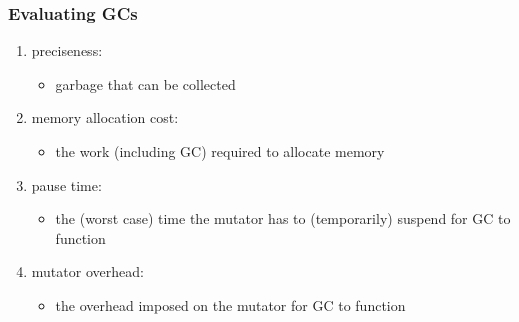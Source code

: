 \documentclass[11pt,dvipdfmx]{beamer}
\newif\ifja
\newif\ifeng
\newcommand{\ao}[1]{{\color{blue}#1}}
\newcommand{\aka}[1]{{\color{red}#1}}
\begin{document}
\begin{frame}
\frametitle{Evaluating GCs}
\begin{enumerate}
\item \ao{preciseness:} 
  \begin{itemize}
  \item garbage that can be collected
  \end{itemize}
\item \ao{memory allocation cost:} 
  \begin{itemize}
  \item the work (including GC) required to allocate memory 
  \end{itemize}
\item \ao{pause time:} 
  \begin{itemize}
  \item the (worst case) time the mutator has to (temporarily) suspend
    for GC to function
  \end{itemize}
\item \ao{mutator overhead:} 
  \begin{itemize}
  \item the overhead imposed on the mutator for GC to function
  \end{itemize}
\end{enumerate}
\end{frame}
\fi

\ifja
\begin{frame}
\frametitle{基準1: 正確さ}
\begin{itemize}
\item \aka{参照カウントは循環ゴミを回収できない}
\item 参照カウント $<$ 走査型 (走査型のほうが通常優れる)
\end{itemize}

\begin{center}
\texttt{[image: out/pdf/svg/refcount\_0.pdf]}
\end{center}
\end{frame}
\fi
\ifeng
\begin{frame}
\frametitle{Criteria \#1: preciseness}
\begin{itemize}
\item \aka{\it reference counting cannot reclaim cyclic garbage}
\item reference count $<$ traversing GC (traversing GC is better)
\end{itemize}

\begin{center}
\texttt{[image: out/pdf/svg/refcount\_en\_0.pdf]}
\end{center}
\end{frame}
\fi
\end{document}
